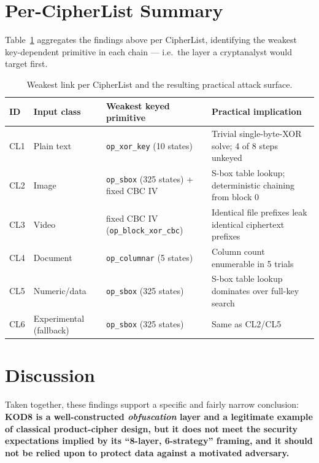 \documentclass[11pt]{article}
\begin{document}
\section{Per-CipherList Summary}

Table~\ref{tab:cl-summary} aggregates the findings above per CipherList,
identifying the weakest key-dependent primitive in each chain — i.e.\
the layer a cryptanalyst would target first.

\begin{table}[h]
\centering
\small
\caption{Weakest link per CipherList and the resulting practical attack surface.}
\label{tab:cl-summary}
\begin{tabular}{@{}p{1.1cm}p{3.6cm}p{4.6cm}p{4.2cm}@{}}
\toprule
\textbf{ID} & \textbf{Input class} & \textbf{Weakest keyed primitive} & \textbf{Practical implication} \\
\midrule
CL1 & Plain text & \texttt{op\_xor\_key} (10 states) & Trivial single-byte-XOR solve; 4 of 8 steps unkeyed \\
CL2 & Image & \texttt{op\_sbox} (325 states) + fixed CBC IV & S-box table lookup; deterministic chaining from block 0 \\
CL3 & Video & fixed CBC IV (\texttt{op\_block\_xor\_cbc}) & Identical file prefixes leak identical ciphertext prefixes \\
CL4 & Document & \texttt{op\_columnar} (5 states) & Column count enumerable in 5 trials \\
CL5 & Numeric/data & \texttt{op\_sbox} (325 states) & S-box table lookup dominates over full-key search \\
CL6 & Experimental (fallback) & \texttt{op\_sbox} (325 states) & Same as CL2/CL5 \\
\bottomrule
\end{tabular}
\end{table}

\section{Discussion}

Taken together, these findings support a specific and fairly narrow
conclusion: \textbf{KOD8 is a well-constructed \emph{obfuscation}
layer and a legitimate example of classical product-cipher design, but
it does not meet the security expectations implied by its ``8-layer,
6-strategy'' framing, and it should not be relied upon to protect data
against a motivated adversary.}
\end{document}
